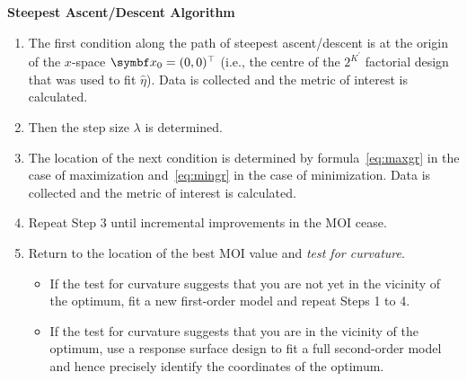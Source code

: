 \begin{framed}
    \textbf{Steepest Ascent/Descent Algorithm}
    \begin{enumerate}[1.]
        \item The first condition along the path of steepest ascent/descent is at the origin of the $x$-space
              $ \Vector{x}_0=(0,0)^\top $ (i.e., the centre of the $ 2^{K^\prime} $ factorial design that was used to fit $ \hat{\eta} $).
              Data is collected and the metric of interest is calculated.
        \item Then the step size $ \lambda $ is determined.
        \item The location of the next condition is determined by formula~\ref{eq:maxgr} in the case of maximization and~\ref{eq:mingr} in the case of minimization. Data is collected and the metric of interest is calculated.
        \item Repeat Step 3 until incremental improvements in the MOI cease.
        \item Return to the location of the best MOI value and \emph{test for curvature}.
              \begin{itemize}[$\rightarrow$]
                  \item If the test for curvature suggests that you are not yet in the vicinity of the optimum, fit a
                        new first-order model and repeat Steps 1 to 4.
                  \item If the test for curvature suggests that you are in the vicinity of the optimum, use a response
                        surface design to fit a full second-order model and hence precisely identify the coordinates of
                        the optimum.
              \end{itemize}
    \end{enumerate}
\end{framed}
